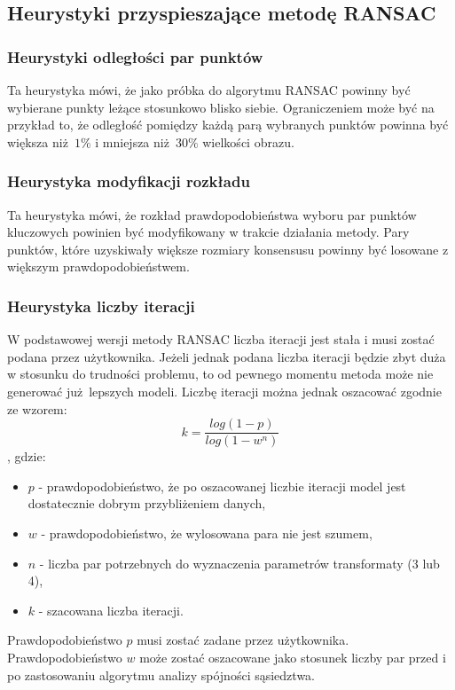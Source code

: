 \documentclass{article}
\begin{document}
	\subsection{Heurystyki przyspieszające metodę RANSAC}
	\subsubsection{Heurystyki odległości par punktów}
	Ta heurystyka mówi, że jako próbka do algorytmu RANSAC powinny być wybierane punkty leżące stosunkowo blisko siebie. Ograniczeniem może być na przykład to, że odległość pomiędzy każdą parą wybranych punktów powinna być większa niż $1\%$ i mniejsza niż $30\%$ wielkości obrazu.
	\subsubsection{Heurystyka modyfikacji rozkładu}
	Ta heurystyka mówi, że rozkład prawdopodobieństwa wyboru par punktów kluczowych powinien być modyfikowany w trakcie działania metody. Pary punktów, które uzyskiwały większe rozmiary konsensusu powinny być losowane z większym prawdopodobieństwem.
	\subsubsection{Heurystyka liczby iteracji}
	W podstawowej wersji metody RANSAC liczba iteracji jest stała i musi zostać podana przez użytkownika. Jeżeli jednak podana liczba iteracji będzie zbyt duża w stosunku  do trudności problemu, to od pewnego momentu metoda może nie generować już lepszych modeli. Liczbę iteracji można jednak oszacować zgodnie ze wzorem: 
	\begin{equation}
		k = \frac{log\left(1 - p\right)}{log\left(1 - w^n\right)}
	\end{equation}
	, gdzie: 
	\begin{itemize}
		\item $p$ - prawdopodobieństwo, że po oszacowanej liczbie iteracji model jest dostatecznie dobrym przybliżeniem danych,
		\item $w$ - prawdopodobieństwo, że wylosowana para nie jest szumem,
		\item $n$ - liczba par potrzebnych do wyznaczenia parametrów transformaty (3 lub 4),
		\item $k$ - szacowana liczba iteracji.
	\end{itemize}
	Prawdopodobieństwo $p$ musi zostać zadane przez użytkownika. Prawdopodobieństwo $w$ może zostać oszacowane jako stosunek liczby par przed i po zastosowaniu algorytmu analizy spójności sąsiedztwa.
\end{document}
